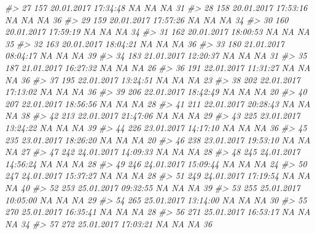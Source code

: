 \documentclass[12pt,ngerman,]{book}
\makeatletter
\newenvironment{Shaded}{\begin{snugshade}}{\end{snugshade}}
\newcommand{\CommentTok}[1]{\textcolor[rgb]{0.56,0.35,0.01}{\textit{{#1}}}}
\newenvironment{kframe}{%
\medskip{}
\setlength{\fboxsep}{.8em}
 \def\at@end@of@kframe{}%
 \ifinner\ifhmode%
  \def\at@end@of@kframe{\end{minipage}}%
  \begin{minipage}{\columnwidth}%
 \fi\fi%
 \def\FrameCommand##1{\hskip\@totalleftmargin \hskip-\fboxsep
 \colorbox{shadecolor}{##1}\hskip-\fboxsep
     \hskip-\linewidth \hskip-\@totalleftmargin \hskip\columnwidth}%
 \MakeFramed {\advance\hsize-\width
   \@totalleftmargin\z@ \linewidth\hsize
   \@setminipage}}%
 {\par\unskip\endMakeFramed%
 \at@end@of@kframe}
\renewenvironment{Shaded}{\begin{kframe}}{\end{kframe}}
\makeatother
\begin{document}
\begin{Shaded}
\begin{Highlighting}[]
{\CommentTok{#> 27        157 20.01.2017 17:34:48         NA        NA       NA    31}
\CommentTok{#> 28        158 20.01.2017 17:53:16         NA        NA       NA    36}
\CommentTok{#> 29        159 20.01.2017 17:57:26         NA        NA       NA    34}
\CommentTok{#> 30        160 20.01.2017 17:59:19         NA        NA       NA    34}
\CommentTok{#> 31        162 20.01.2017 18:00:53         NA        NA       NA    35}
\CommentTok{#> 32        163 20.01.2017 18:04:21         NA        NA       NA    36}
\CommentTok{#> 33        180 21.01.2017 08:04:17         NA        NA       NA    39}
\CommentTok{#> 34        183 21.01.2017 12:20:37         NA        NA       NA    31}
\CommentTok{#> 35        187 21.01.2017 16:27:32         NA        NA       NA    26}
\CommentTok{#> 36        191 22.01.2017 11:31:27         NA        NA       NA    36}
\CommentTok{#> 37        195 22.01.2017 13:24:51         NA        NA       NA    23}
\CommentTok{#> 38        202 22.01.2017 17:13:02         NA        NA       NA    36}
\CommentTok{#> 39        206 22.01.2017 18:42:49         NA        NA       NA    20}
\CommentTok{#> 40        207 22.01.2017 18:56:56         NA        NA       NA    28}
\CommentTok{#> 41        211 22.01.2017 20:28:43         NA        NA       NA    38}
\CommentTok{#> 42        213 22.01.2017 21:47:06         NA        NA       NA    29}
\CommentTok{#> 43        225 23.01.2017 13:24:22         NA        NA       NA    39}
\CommentTok{#> 44        226 23.01.2017 14:17:10         NA        NA       NA    36}
\CommentTok{#> 45        235 23.01.2017 18:26:20         NA        NA       NA    20}
\CommentTok{#> 46        238 23.01.2017 19:53:10         NA        NA       NA    27}
\CommentTok{#> 47        242 24.01.2017 14:09:33         NA        NA       NA    28}
\CommentTok{#> 48        245 24.01.2017 14:56:24         NA        NA       NA    28}
\CommentTok{#> 49        246 24.01.2017 15:09:44         NA        NA       NA    24}
\CommentTok{#> 50        247 24.01.2017 15:37:27         NA        NA       NA    28}
\CommentTok{#> 51        249 24.01.2017 17:19:54         NA        NA       NA    40}
\CommentTok{#> 52        253 25.01.2017 09:32:55         NA        NA       NA    39}
\CommentTok{#> 53        255 25.01.2017 10:05:00         NA        NA       NA    29}
\CommentTok{#> 54        265 25.01.2017 13:14:00         NA        NA       NA    30}
\CommentTok{#> 55        270 25.01.2017 16:35:41         NA        NA       NA    28}
\CommentTok{#> 56        271 25.01.2017 16:53:17         NA        NA       NA    34}
\CommentTok{#> 57        272 25.01.2017 17:03:21         NA        NA       NA    36}
}
\end{Highlighting}
\end{Shaded}
\end{document}
